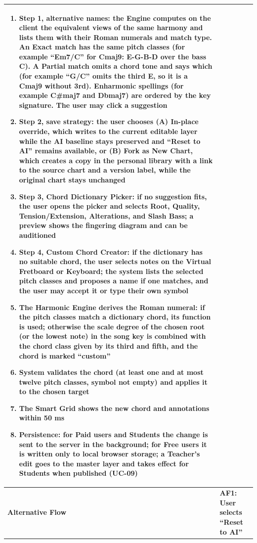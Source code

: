 \documentclass[a4paper]{article}
\newlength{\ucLeft}
\begin{document}
\begin{longtable}{|>{\bfseries}p{\ucLeft}|p{\dimexpr\linewidth-\ucLeft-2\tabcolsep-2\arrayrulewidth}|}
\begin{enumerate}[leftmargin=1.5em, nosep, topsep=2pt, partopsep=0pt, parsep=0pt, after=\strut]
    \item Step 1, alternative names: the Engine computes on the client the equivalent views of the same harmony and lists them with their Roman numerals and match type. An Exact match has the same pitch classes (for example ``Em7/C'' for Cmaj9: E-G-B-D over the bass C). A Partial match omits a chord tone and says which (for example ``G/C'' omits the third E, so it is a Cmaj9 without 3rd). Enharmonic spellings (for example C\#maj7 and Dbmaj7) are ordered by the key signature. The user may click a suggestion
    \item Step 2, save strategy: the user chooses (A) In-place override, which writes to the current editable layer while the AI baseline stays preserved and ``Reset to AI'' remains available, or (B) Fork as New Chart, which creates a copy in the personal library with a link to the source chart and a version label, while the original chart stays unchanged
    \item Step 3, Chord Dictionary Picker: if no suggestion fits, the user opens the picker and selects Root, Quality, Tension/Extension, Alterations, and Slash Bass; a preview shows the fingering diagram and can be auditioned
    \item Step 4, Custom Chord Creator: if the dictionary has no suitable chord, the user selects notes on the Virtual Fretboard or Keyboard; the system lists the selected pitch classes and proposes a name if one matches, and the user may accept it or type their own symbol
    \item The Harmonic Engine derives the Roman numeral: if the pitch classes match a dictionary chord, its function is used; otherwise the scale degree of the chosen root (or the lowest note) in the song key is combined with the chord class given by its third and fifth, and the chord is marked ``custom''
    \item System validates the chord (at least one and at most twelve pitch classes, symbol not empty) and applies it to the chosen target
    \item The Smart Grid shows the new chord and annotations within 50 ms
    \item Persistence: for Paid users and Students the change is sent to the server in the background; for Free users it is written only to local browser storage; a Teacher's edit goes to the master layer and takes effect for Students when published (UC-09)
\end{enumerate}
\\ \hline
Alternative Flow &
\textbf{AF1: User selects ``Reset to AI''}

\end{longtable}
\end{document}
